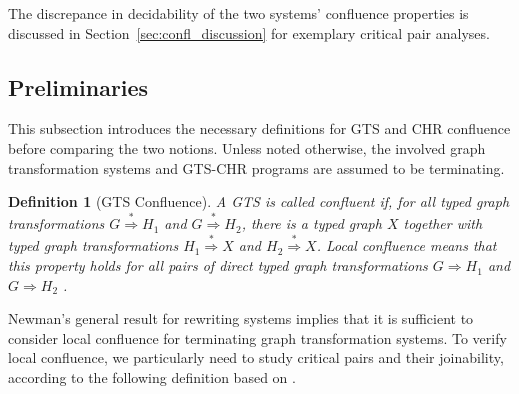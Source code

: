 \documentclass{tlp}
\newtheorem{definition}{Definition}[section]
\newcommand{\dergts}{\ensuremath{\Rightarrow}}
\begin{document}
The discrepance in decidability of the two systems' confluence properties is
discussed in Section~\ref{sec:confl_discussion} for exemplary critical pair
analyses.

\subsection{Preliminaries}
\label{sec:confl_gts}

This subsection introduces the necessary definitions for GTS and CHR confluence
before comparing the two notions. Unless noted otherwise, the involved graph
transformation systems and GTS-CHR programs are assumed to be terminating.

\begin{definition}[GTS Confluence]A GTS is called \emph{confluent} if, for all
typed graph transformations $G \stackrel{*}{\Longrightarrow} H_1$ and $G
\stackrel{*}{\Longrightarrow} H_2$, there is a typed graph $X$ together with
typed graph transformations $H_1 \stackrel{*}{\Longrightarrow} X$ and $H_2
\stackrel{*}{\Longrightarrow} X$. \emph{Local confluence} means that this
property holds for all pairs of direct typed graph transformations $G \dergts
H_1$ and $G \dergts H_2$ \cite{ehrigprangetaentzer06}.
\end{definition}

Newman's general result for rewriting systems \cite{newman} implies that it is
sufficient to consider local confluence for terminating graph transformation
systems. To verify local confluence, we particularly need to study critical pairs
and their joinability, according to the following definition based on
\cite{ehrigprangetaentzer06,plump05}.
\end{document}
